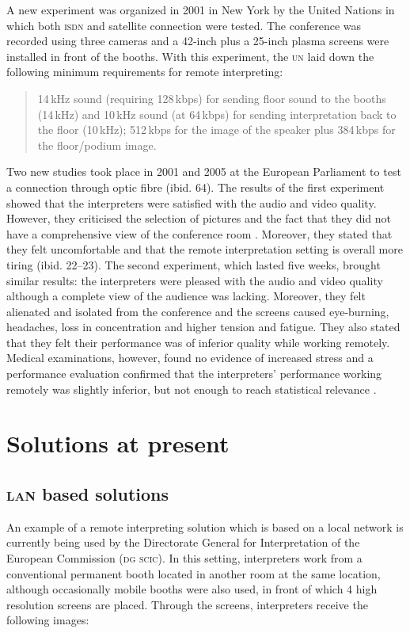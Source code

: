\documentclass[output=paper]{langsci/langscibook}
\begin{document}
A new experiment was organized in 2001 in New York by the United Nations in which both \textsc{isdn} and satellite connection were tested. The conference was recorded using three cameras and a 42-inch plus a 25-inch plasma screens were installed in front of the booths. With this experiment, the \textsc{un} laid down the following minimum requirements for remote interpreting:

\begin{quote}
14\,kHz sound (requiring 128\,kbps) for sending floor sound to the booths (14\,kHz) and 10\,kHz sound (at 64\,kbps) for sending interpretation back to the floor (10\,kHz); 512\,kbps for the image of the speaker plus 384\,kbps for the floor/podium image. \citep[63]{Mouzourakis2006}
\end{quote}

Two new studies took place in 2001 and 2005 at the European Parliament to test a connection through optic fibre (ibid. 64). The results of the first experiment showed that the interpreters were satisfied with the audio and video quality. However, they criticised the selection of pictures and the fact that they did not have a comprehensive view of the conference room \citep[19--21]{Europarl2001}. Moreover, they stated that they felt uncomfortable and that the remote interpretation setting is overall more tiring (ibid. 22--23). The second experiment, which lasted five weeks, brought similar results: the interpreters were pleased with the audio and video quality although a complete view of the audience was lacking. Moreover, they felt alienated and isolated from the conference and the screens caused eye-burning, headaches, loss in concentration and higher tension and fatigue. They also stated that they felt their performance was of inferior quality while working remotely. Medical examinations, however, found no evidence of increased stress and a performance evaluation confirmed that the interpreters’ performance working remotely was slightly inferior, but not enough to reach statistical relevance \citep[225--243]{Roziner2010}.

\section{Solutions at present}
\label{sec:ziegler:04}
\subsection{\textsc{lan} based solutions} 
\label{sub:ziegler:4.1}
An example of a remote interpreting solution which is based on a local network is currently being used by the Directorate General for Interpretation of the European Commission (\textsc{dg scic}). In this setting, interpreters work from a conventional permanent booth located in another room at the same location, although occasionally mobile booths were also used, in front of which 4 high resolution screens are placed. Through the screens, interpreters receive the following images:
\end{document}

